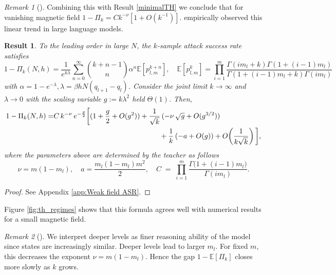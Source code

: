 \documentclass{article}
\newtheorem{theorem}{Result}
\theoremstyle{remark} %
\newtheorem{remark}{Remark}
\begin{document}
\begin{remark}[]\label{rem:h=0}
Combining this with Result \ref{minimalTH} we conclude that
for vanishing magnetic field $1-\Pi_k = C k^{-\nu} \left[1 + O(k^{-1})\right]$.  \cite{hughes2024best} empirically observed this linear trend in large language models.  
\end{remark}

\begin{theorem}
\label{thm:low_field}
To the leading order in large $N$, the $k$-sample attack success rate satisfies
\begin{equation}
1-\Pi_k(N,h) = \frac{1}{e^{k\lambda}} \sum_{n=0}^\infty \binom{k+n-1}{n} \alpha^n \mathbb{E}[p_{l,m}^{k+n}], \quad \mathbb{E}[p_{l,m}^k] = \prod_{i=1}^m \frac{\Gamma(im_l+k)\Gamma(1+(i-1)m_l)}{\Gamma(1+(i-1)m_l+k)\Gamma(im_l)}
\label{eq:series_moments}
\end{equation}
with $\alpha =1-e^{-\lambda}, \lambda =\beta h N (q_{l+1}-q_l)$.
Consider the joint limit $k\to\infty$ and $\lambda \to 0$ with the scaling variable
$g:=k\lambda^2$
held $\Theta(1)$. Then,
\begin{equation}
\begin{aligned}
    1-\Pi_k(N,h)
=&
C\,k^{-\nu}\,e^{-\frac{g}{2}}
\bigg[
(1+\frac{g}{2}+O(g^2))
+\frac{1}{\sqrt{k}}\,( -\nu\,\sqrt{g}+O(g^{3/2}))
\\& \hspace{5.2cm} +\frac{1}{k}\,(-a+O(g))
+O\!\left(\frac{1}{k\sqrt{k}}\right)
\bigg],
\end{aligned}
\label{eq:thm_asr_magnetic_field}
\end{equation}
where the parameters above are determined by the teacher as follows
\[
\nu = m(1-m_l), \quad 
a = \frac{m_l(1-m_l)m^2}{2}, \quad C\;=\;\prod_{i=1}^{m}\frac{\Gamma\!\big(1+(i-1)m_l\big)}{\Gamma(im_l)}.
\]
\end{theorem}

\begin{proof}
    See Appendix \ref{app:Weak field ASR}.
\end{proof}

Figure \ref{fig:th_regimes} shows that this formula agrees well  with numerical results for a small magnetic field.

\begin{remark}[]\label{rm:deeper_levels}
 We interpret deeper levels as finer reasoning ability of the model since states are increasingly similar. Deeper levels lead to larger $m_l$. For fixed $m$, this decreases the exponent
$\nu=m(1-m_l)$. Hence the gap $1-\mathbb{E}[\Pi_k]$ closes more slowly as $k$ grows.
\end{remark}
\end{document}
